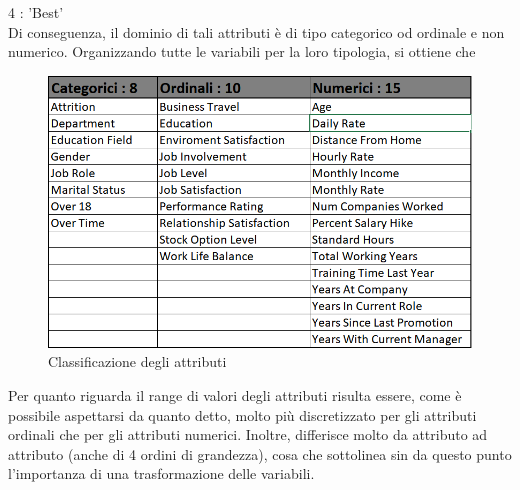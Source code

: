 \documentclass[english]{article}
\begin{document}
4 : 'Best'
\\ Di conseguenza, il dominio di tali attributi è di tipo categorico od ordinale e non numerico. Organizzando tutte le variabili per la loro tipologia, si ottiene che
\begin{figure}[h]
\centering
\includegraphics[scale=0.55]{semantics.png}
\caption{Classificazione degli attributi}
\end{figure}

Per quanto riguarda il range di valori degli attributi risulta essere, come è possibile aspettarsi da quanto detto, molto più discretizzato per gli attributi ordinali che per gli attributi numerici. Inoltre, differisce molto da attributo ad attributo (anche di 4 ordini di grandezza), cosa che sottolinea sin da questo punto l'importanza di una trasformazione delle variabili.
\end{document}
